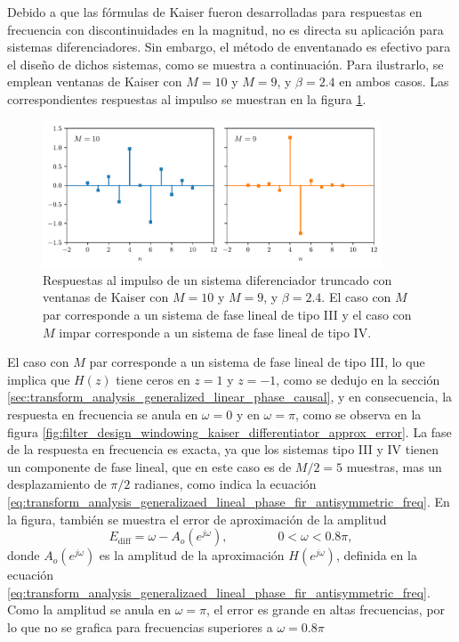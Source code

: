 \documentclass[a4paper]{report}
\begin{document}
Debido a que las fórmulas de Kaiser fueron desarrolladas para respuestas en frecuencia con discontinuidades en la magnitud, no es directa su aplicación para sistemas diferenciadores. Sin embargo, el método de enventanado es efectivo para el diseño de dichos sistemas, como se muestra a continuación. Para ilustrarlo, se emplean ventanas de Kaiser con \(M=10\) y \(M=9\), y \(\beta=2.4\) en ambos casos. Las correspondientes respuestas al impulso se muestran en la figura \ref{fig:filter_design_windowing_kaiser_differentiator_impulse_response}. 
\begin{figure}[!htb]
 \begin{center}
 \includegraphics[width=0.9\textwidth]{figuras/filter_design_windowing_kaiser_differentiator_impulse_response.pdf}
 \caption{\label{fig:filter_design_windowing_kaiser_differentiator_impulse_response} Respuestas al impulso de un sistema diferenciador truncado con ventanas de Kaiser con \(M=10\) y \(M=9\), y \(\beta=2.4\). El caso con \(M\) par corresponde a un sistema de fase lineal de tipo III y el caso con \(M\) impar corresponde a un sistema de fase lineal de tipo IV.}
 \end{center}
\end{figure}

El caso con \(M\) par corresponde a un sistema de fase lineal de tipo III, lo que implica que \(H(z)\) tiene ceros en \(z=1\) y \(z=-1\), como se dedujo en la sección \ref{sec:transform_analysis_generalized_linear_phase_causal}, y en consecuencia, la respuesta en frecuencia se anula en \(\omega=0\) y en \(\omega=\pi\), como se observa en la figura \ref{fig:filter_design_windowing_kaiser_differentiator_approx_error}. La fase de la respuesta en frecuencia es exacta, ya que los sistemas tipo III y IV tienen un componente de fase lineal, que en este caso es de \(M/2=5\) muestras, mas un  desplazamiento de \(\pi/2\) radianes, como indica la ecuación \ref{eq:transform_analysis_generalizaed_lineal_phase_fir_antisymmetric_freq}. En la figura, también se muestra el error de aproximación de la amplitud
\[
 E_\textrm{diff}=\omega-A_o(e^{j\omega}),
 \qquad\qquad
 0<\omega<0.8\pi,
\]
donde \(A_o(e^{j\omega})\) es la amplitud de la aproximación \(H(e^{j\omega})\), definida en la ecuación \ref{eq:transform_analysis_generalizaed_lineal_phase_fir_antisymmetric_freq}. Como la amplitud se anula en \(\omega=\pi\), el error es grande en altas frecuencias, por lo que no se grafica para frecuencias superiores a \(\omega=0.8\pi\)
\end{document}
